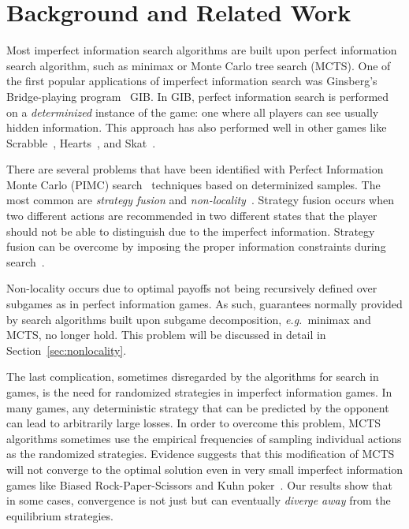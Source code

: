 \documentclass{aamas2015}
\newcommand{\eg}{{\it e.g.}~}
\begin{document}

\section{Background and Related Work}

Most imperfect information search algorithms are built upon perfect information search algorithm, such as minimax or Monte Carlo tree search (MCTS).  
One of the first popular applications of imperfect information search was Ginsberg's Bridge-playing program~\cite{Ginsberg96Partition,Ginsberg01} GIB. 
In GIB, perfect information search is performed on a {\it determinized} instance of the game: one where all players can see usually hidden information. 
This approach has also performed well in other games like Scrabble~\cite{Sheppard02World}, 
Hearts~\cite{Sturtevant08An}, and Skat~\cite{Buro09Improving}. 

There are several problems that have been identified with Perfect Information Monte Carlo
(PIMC) search~\cite{Long10Understanding} techniques
based on determinized samples. The most common are {\it strategy fusion} and {\it non-locality}~\cite{Frank98Finding}.
Strategy fusion occurs when two different actions are recommended in two different states that the player 
should not be able to distinguish  due to the imperfect information.
Strategy fusion can be overcome by imposing the proper information constraints during 
search~\cite{Frank98Finding,Ciancarini10Kriegspiel,Ponsen11Computing,Lisy12peg,Cowling12ISMCTS}. 

Non-locality occurs due to optimal payoffs not being recursively defined over subgames as  
in perfect information games. As such, guarantees normally provided by search algorithms built upon 
subgame decomposition, \eg minimax and MCTS, no longer hold. This problem will be discussed in detail in Section~\ref{sec:nonlocality}.  

The last complication, sometimes disregarded by the algorithms for search in games, is the need for randomized strategies in imperfect information games. In many games, any deterministic strategy that can be predicted by the opponent can lead to arbitrarily large losses.
In order to overcome this problem, MCTS algorithms sometimes use the empirical frequencies of sampling individual actions as the randomized strategies.
Evidence suggests that this modification of MCTS will not converge to the optimal solution even in very
small imperfect information games like Biased Rock-Paper-Scissors and Kuhn poker~\cite{Shafiei09,Ponsen11Computing}.
Our results show that in some cases, convergence is not just but can eventually
{\it diverge away} from the equilibrium strategies.
\end{document}

